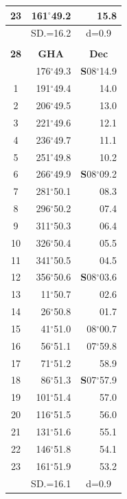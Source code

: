 \documentclass[10pt, a4paper]{report}
\begin{document}
\begin{scriptsize}
\begin{tabular*}{0.2\textwidth}[t]{@{\extracolsep{\fill}}|c|rr|}
23 & 161$^\circ$49.2 & 15.8\\
\hline
\rule{0pt}{2.4ex} & \multicolumn{1}{c}{SD.=16.2} & \multicolumn{1}{c|}{d=0.9}\\
\hline
\multicolumn{1}{c}{}\\[-0.5ex]\hline
\multicolumn{1}{|c|}{\rule{0pt}{2.6ex}\textbf{28}} & \multicolumn{1}{c}{\textbf{GHA}} & \multicolumn{1}{c|}{\textbf{Dec}}\\
\hline\rule{0pt}{2.6ex}\noindent
0 & 176$^\circ$49.3 & \textbf{S}08$^\circ$14.9\\
1 & 191$^\circ$49.4 & 14.0\\
2 & 206$^\circ$49.5 & 13.0\\
3 & 221$^\circ$49.6 & \raisebox{0.24ex}{\boldmath$\cdot$~\boldmath$\cdot$~~}12.1\\
4 & 236$^\circ$49.7 & 11.1\\
5 & 251$^\circ$49.8 & 10.2\\[2Pt]
6 & 266$^\circ$49.9 & \textbf{S}08$^\circ$09.2\\
7 & 281$^\circ$50.1 & 08.3\\
8 & 296$^\circ$50.2 & 07.4\\
9 & 311$^\circ$50.3 & \raisebox{0.24ex}{\boldmath$\cdot$~\boldmath$\cdot$~~}06.4\\
10 & 326$^\circ$50.4 & 05.5\\
11 & 341$^\circ$50.5 & 04.5\\[2Pt]
12 & 356$^\circ$50.6 & \textbf{S}08$^\circ$03.6\\
13 & 11$^\circ$50.7 & 02.6\\
14 & 26$^\circ$50.8 & 01.7\\
15 & 41$^\circ$51.0 & 08$^\circ$00.7\\
16 & 56$^\circ$51.1 & 07$^\circ$59.8\\
17 & 71$^\circ$51.2 & 58.9\\[2Pt]
18 & 86$^\circ$51.3 & \textbf{S}07$^\circ$57.9\\
19 & 101$^\circ$51.4 & 57.0\\
20 & 116$^\circ$51.5 & 56.0\\
21 & 131$^\circ$51.6 & \raisebox{0.24ex}{\boldmath$\cdot$~\boldmath$\cdot$~~}55.1\\
22 & 146$^\circ$51.8 & 54.1\\
23 & 161$^\circ$51.9 & 53.2\\
\hline
\rule{0pt}{2.4ex} & \multicolumn{1}{c}{SD.=16.1} & \multicolumn{1}{c|}{d=0.9}\\
\hline
\end{tabular*}\noindent

\end{scriptsize}
\end{document}
